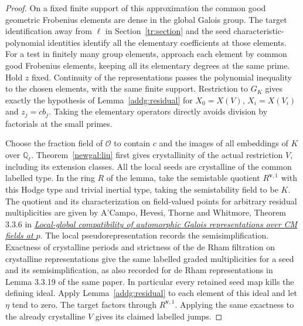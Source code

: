 \begin{proof}
On a fixed finite support of this approximation the common good
geometric Frobenius elements are dense in the global Galois group.
The target identification away from \(\ell\) in Section~\ref{tr:section}
and the seed characteristic-polynomial identities identify all the
elementary coefficients at those elements. For a test in finitely many
group elements, approach each element by common good Frobenius elements,
keeping all its elementary degrees at the same prime. Hold \(z\) fixed.
Continuity of the representations passes the polynomial inequality to
the chosen elements, with the same finite support. Restriction to
\(G_K\) gives exactly the hypothesis of Lemma~\ref{addg:residual} for
\(X_0=X(V)\), \(X_i=X(V_i)\) and \(z_j=cb_j\). Taking the elementary
operators directly avoids division by factorials at the small primes.

Choose the fraction field of \(\mathcal O\) to contain \(c\) and the
images of all embeddings of \(K\) over \(\mathbb Q_\ell\).
Theorem~\ref{newgal:liu} first gives crystallinity of the actual
restriction \(V\), including its extension classes. All the local seeds
are crystalline of the common labelled type. In the ring \(R\) of the
lemma, take the semistable quotient \(R^{\mathbf v,1}\) with this Hodge
type and trivial inertial type, taking the semistability field to be
\(K\). The quotient and its characterization on field-valued points for
arbitrary residual multiplicities are given by A'Campo, Hevesi, Thorne
and Whitmore, Theorem 3.3.6 in
\href{https://arxiv.org/abs/2607.11763}{\emph{Local-global compatibility of automorphic Galois representations over CM fields at \(p\)}}.
The local pseudorepresentation records the semisimplification. Exactness
of crystalline periods and strictness of the de Rham filtration on
crystalline representations give the same labelled graded multiplicities
for a seed and its semisimplification, as also recorded for de Rham
representations in Lemma 3.3.19 of the same paper. In particular every retained
seed map kills the defining ideal. Apply Lemma~\ref{addg:residual} to
each element of this ideal and let \(\eta\) tend to zero. The target
factors through \(R^{\mathbf v,1}\). Applying the same exactness to the
already crystalline \(V\) gives its claimed labelled jumps.


\end{proof}
